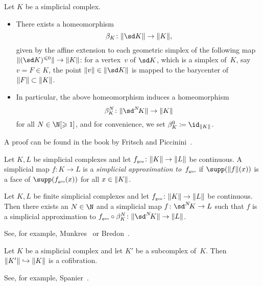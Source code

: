 \begin{thProposition}
    Let $K$ be a simplicial complex. 
    \begin{itemize}
        \item
            There exists a homeomorphism
            \[ \beta_K\colon \geom{\sd K} \to \geom{K}  , \]
            given by the affine extension to each geometric simplex of the
            following map $\geom{(\sd K)^{\leq 0}}\to\geom{K}$: for a vertex~$v$
            of $\sd K$, which is a simplex of~$K$, say $v = F\in K$, the point
            $\geom{v}\in\geom{\sd K}$ is mapped to the barycenter of $\lVert F\rVert\subset\lVert K\rVert$.
            
        \item
            In particular, the above homeomorphism induces a homeomorphism
            \[ \beta_K^N\colon\geom{\sdNK}\to\geom{K} \]
            for all $N\in\N[\geq1]$, and for convenience, we set
            $\beta_K^0 \defeq \id_{\geom K}$.
    \end{itemize}
\end{thProposition}

A proof can be found in the book by Fritsch and
Piccinini~\cite[Proposition~3.3.16]{bookc:fritschpiccinini90}.

\begin{thDef}
    Let $K,L$ be simplicial complexes and let $f_{\scriptscriptstyle\mathrm{geo}}\colon\lVert K\rVert\to\lVert L\rVert$
    be continuous.  A simplicial map $f\colon K\to L$ is a \emph{simplicial
    approximation to~$f_{\scriptscriptstyle\mathrm{geo}}$} if $\supp(\geom{f}(x))$ is a face of
    $\supp(f_\geo(x))$ for all $x\in\lVert K\rVert$.
\end{thDef}

\begin{thTheorem}
    \label{ch1:simpapprox}
    Let $K,L$ be finite simplicial complexes and let
    $f_{\scriptscriptstyle\mathrm{geo}}\colon\lVert K\rVert\to\lVert L\rVert$ be continuous.
    Then there exists an $N\in\N$ and a simplicial map $f\colon\sdNK\to L$
    such that $f$ is a simplicial approximation to
    $f_\geo\after\beta_K^N\colon\geom{\sdNK}\to\geom L$.
\end{thTheorem}
%
See, for example,
Munkres~\cite[Theorem~16.1]{bookc:munkres84}
or Bredon~\cite[Theorem~22.10]{bookc:bredon93}.

\begin{thLemma}
    \label{ch1:inclcofibration}
    Let $K$ be a simplicial complex and let $K'$ be a subcomplex
    of~$K$. Then $\lVert K'\rVert\hookrightarrow\lVert K\rVert$ is a cofibration.
\end{thLemma}
%
See, for example, Spanier~\cite[Ch.~3,\;Sec.~2,\;Corollary~5]{bookc:spanier66}.
